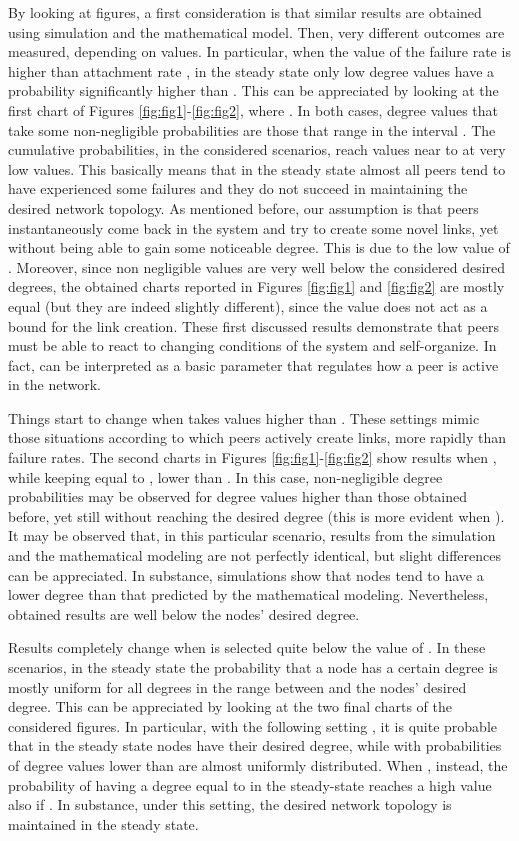 \documentclass[a4paper,twosided]{article}
\begin{document}
By looking at figures, a first consideration is that similar results are obtained using simulation and the mathematical model. Then, very different outcomes are measured, depending on  values. In particular, when the value of the failure rate  is higher than attachment rate , in the steady state only low degree values have a probability significantly higher than . This can be appreciated by looking at the first chart of Figures \ref{fig:fig1}-\ref{fig:fig2}, where . 
In both cases, degree values that take some non-negligible probabilities are those that range in the interval . The cumulative probabilities, in the considered scenarios, reach values near to  at very low values. This basically means that in the steady state almost all peers tend to have experienced some failures and they do not succeed in maintaining the desired network topology. As mentioned before, our assumption is that peers instantaneously come back in the system and try to create some novel links, yet without being able to gain some noticeable degree. This is due to the low value of . Moreover, since non negligible values are very well below the considered desired degrees, the obtained charts reported in Figures \ref{fig:fig1} and \ref{fig:fig2}
are mostly equal (but they are indeed slightly different), since the  value does not act as a bound for the link creation. 
These first discussed results demonstrate that peers must be able to react to changing conditions of the system and self-orga\-ni\-ze. In fact,  can be interpreted as a basic parameter that regulates how a peer is active in the network.


Things start to change when  takes values higher than . These settings mimic those situations according to which peers actively create links, more rapidly than failure rates. The second charts in Figures \ref{fig:fig1}-\ref{fig:fig2} show results when , while keeping  equal to , lower than . In this case, non-negligible degree probabilities may be observed for degree values higher than those obtained before, yet still without reaching the desired degree (this is more evident when ). It may be observed that, in this particular scenario, results from the simulation and the mathematical modeling are not perfectly identical, but slight differences can be appreciated. In substance, simulations show that nodes tend to have a lower degree than that predicted by the mathematical modeling. Nevertheless, obtained results are well below the nodes' desired degree. 


Results completely change when  is selected quite below the value of . In these scenarios, in the steady state the probability that a node has a certain degree is mostly uniform for all degrees in the range between  and the nodes' desired degree. This can be appreciated by looking at the two final charts of the considered figures.
In particular, with the following setting , it is quite probable that in the steady state nodes have their desired degree, while with  probabilities of degree values lower than  are almost uniformly distributed. When , instead, the probability of having a degree equal to  in the steady-state reaches a high value also if . In substance, under this setting, the desired network topology is maintained in the steady state.
\end{document}
